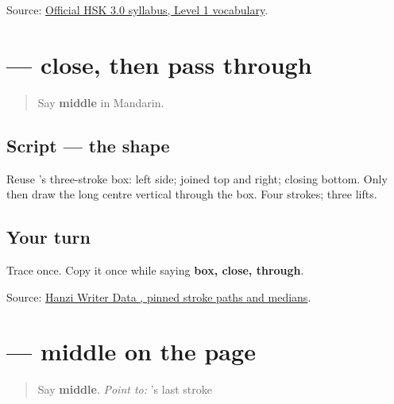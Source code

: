 \begin{tcolorbox}[breakable,colback=teal!4,colframe=teal!35!black,title={Before you move on}]
Source: \href{https://hsk.cn-bj.ufileos.com/3.0/\%E6\%96\%B0\%E7\%89\%88HSK\%E8\%80\%83\%E8\%AF\%95\%E5\%A4\%A7\%E7\%BA\%B21219.pdf}{Official HSK 3.0 syllabus, Level 1 vocabulary}.
\end{tcolorbox}
\section[\texorpdfstring{\zh{中} (zhōng)}{中 (zhōng)}]{ — close, then pass through}

\label{lesson:ZH-W15-zhong}



\begin{quote}
Say \textbf{middle} in Mandarin.
\end{quote}

\subsection*{Script — the shape}

Reuse 's three-stroke box: left side; joined top and right; closing bottom. Only then draw the long centre vertical through the box. Four strokes; three lifts.

\subsection*{Your turn}
Trace \textbf{} once. Copy it once while saying \textbf{box, close, through}.

\begin{tcolorbox}[breakable,colback=teal!4,colframe=teal!35!black,title={Before you move on}]
Source: \href{https://raw.githubusercontent.com/chanind/hanzi-writer-data/68d10a4b21150cae5e1ebbd223eed289cf32d90c/data/\%E4\%B8\%AD.json}{Hanzi Writer Data , pinned stroke paths and medians}.
\end{tcolorbox}
\section[Practice]{ — middle on the page}

\label{lesson:ZH-C15-zhong}



\begin{quote}
Say \textbf{middle}. \emph{Point to:} 's last stroke
\end{quote}

